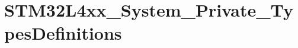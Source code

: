 \hypertarget{group___s_t_m32_l4xx___system___private___types_definitions}{}\section{S\+T\+M32\+L4xx\+\_\+\+System\+\_\+\+Private\+\_\+\+Types\+Definitions}
\label{group___s_t_m32_l4xx___system___private___types_definitions}
